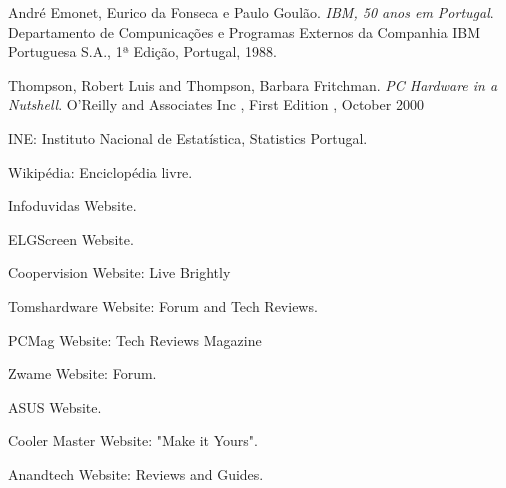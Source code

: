 
\begin{thebibliography}{9}

André Emonet, Eurico da Fonseca e Paulo Goulão.
\textit{IBM, 50 anos em Portugal}. 
Departamento de Compunicações e Programas Externos da Companhia IBM Portuguesa S.A., 1ª Edição, Portugal, 1988.

Thompson, Robert Luis and Thompson, Barbara Fritchman.
\textit{PC Hardware in a Nutshell}.
O'Reilly and Associates Inc , First Edition , October 2000

INE: Instituto Nacional de Estatística, Statistics Portugal.

Wikipédia: Enciclopédia livre. 

Infoduvidas Website.

ELGScreen Website.


Coopervision Website: Live Brightly

Tomshardware Website: Forum and Tech Reviews.

PCMag Website: Tech Reviews Magazine

Zwame Website: Forum.

ASUS Website. 

Cooler Master Website: "Make it Yours". 

Anandtech Website: Reviews and Guides. 


\end{thebibliography}
